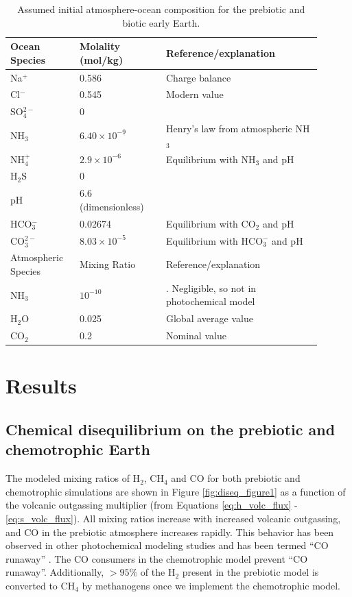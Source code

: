 \begin{table}
  \caption{Assumed initial atmosphere-ocean composition for the prebiotic and biotic early Earth.}
  \label{tab:assumed_comp}
  \begin{center}
  \begin{tabularx}{0.95\linewidth}{p{0.2\linewidth} p{0.25\linewidth} p{0.45\linewidth}}
    \hline \hline
    Ocean Species & Molality (mol/kg) & Reference/explanation \\
    \hline
    Na$^{+}$ & 0.586 & Charge balance 
    \\
    Cl$^{-}$ & 0.545 & Modern value
    \\
    SO$_4^{2-}$ & 0 & \citep{Crowe_2014}
    \\
    NH$_3$ & $6.40 \times 10^{-9}$ & Henry's law from atmospheric NH$_3$
    \\
    NH$_4^{+}$ & $2.9 \times 10^{-6}$ & Equilibrium with NH$_3$ and pH
    \\
    H$_2$S & 0 & \citep{KrissansenTotton_2018c}
    \\
    pH & 6.6 (dimensionless) & \citep{KrissansenTotton_2018}
    \\
    HCO$_3^{-}$ & 0.02674 & Equilibrium with CO$_2$ and pH
    \\
    CO$_3^{2-}$ & $8.03 \times 10^{-5}$ & Equilibrium with HCO$_3^{-}$ and pH 
    \\
    \hline \hline
    Atmospheric Species & Mixing Ratio & Reference/explanation \\
    \hline
    NH$_3$ & $10^{-10}$ & \citet{Wolf_2010}. Negligible, so not in photochemical model
    \\
    H$_2$O & 0.025 & Global average value 
    \\
    CO$_2$ & 0.2 & Nominal value \citep{Kadoya_2020,KrissansenTotton_2018}
  \end{tabularx}
  \end{center}
\end{table}

\section{Results}

\subsection{Chemical disequilibrium on the prebiotic and chemotrophic Earth}

The modeled mixing ratios of H$_2$, CH$_4$ and CO for both prebiotic and chemotrophic simulations are shown in Figure \ref{fig:diseq_figure1} as a function of the volcanic outgassing multiplier (from Equations \eqref{eq:h_volc_flux} - \eqref{eq:s_volc_flux}). All mixing ratios increase with increased volcanic outgassing, and CO in the prebiotic atmosphere increases rapidly. This behavior has been observed in other photochemical modeling studies and has been termed ``CO runaway'' \citep{Kasting_1983,Zahnle_1986}. The CO consumers in the chemotrophic model prevent ``CO runaway''. Additionally, $> 95\%$ of the H$_2$ present in the prebiotic model is converted to CH$_4$ by methanogens once we implement the chemotrophic model. 

